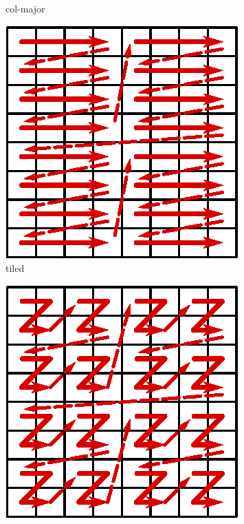 \begin{figure}[h]
\begin{subfigure}{.15\textwidth}
      \caption{col-major}
      \label{fig:layout-col}
  \end{subfigure}
  \begin{subfigure}{.15\textwidth}
      \centering
      \includegraphics[width=.9\linewidth]{img/matrix-tiled}
      \caption{tiled}
      \label{fig:layout-tile}
  \end{subfigure}
  \begin{subfigure}{.15\textwidth}
      \centering
      \includegraphics[width=.9\linewidth]{img/matrix-zcurve}

\end{subfigure}
\end{figure}
